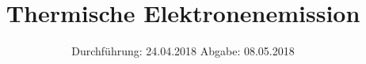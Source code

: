 

\subject{Versuch 504}
\title{Thermische Elektronenemission}
\date{
  Durchführung: 24.04.2018
  \hspace{3em}
  Abgabe: 08.05.2018
}


      \maketitle
      \thispagestyle{empty}
      \tableofcontents
      \newpage
      
      
      
      \newpage
      
      
      \printbibliography{}
      

